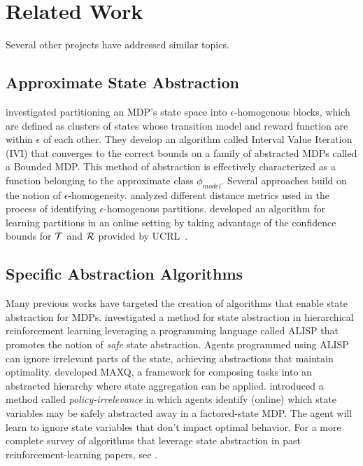 \section{Related Work}

Several other projects have addressed similar topics.

\subsection{Approximate State Abstraction}
\citep*{dean1997model} investigated partitioning an \ac{MDP}'s state space into $\epsilon$-homogenous blocks, which are defined as clusters of states whose transition model and reward function are within $\epsilon$ of each other. They develop an algorithm called Interval Value Iteration (IVI) that converges to the correct bounds on a family of abstracted MDPs called a Bounded MDP. This method of abstraction is effectively characterized as a function belonging to the approximate class $\phi_{model}$.
Several approaches build on the notion of $\epsilon$-homogeneity. \citep*{even2003approximate} analyzed different distance metrics used in the process of identifying $\epsilon$-homogenous partitions. \citep*{ortner2013adaptive} developed an algorithm for learning partitions in an online setting by taking advantage of the confidence bounds for $\mathcal{T}$ and $\mathcal{R}$ provided by UCRL~\cite{auer2009near}.

\subsection{Specific Abstraction Algorithms}
Many previous works have targeted the creation of algorithms that enable state abstraction for MDPs. \citep*{andre2002state} investigated a method for state abstraction in hierarchical reinforcement learning leveraging a programming language called ALISP that promotes the notion of {\it safe} state abstraction. Agents programmed using ALISP can ignore irrelevant parts of the state, achieving abstractions that maintain optimality. \citep{dietterich2000hierarchical} developed MAXQ, a framework for composing tasks into an abstracted hierarchy where state aggregation can be applied. \citep*{jong2005state} introduced a method called {\it policy-irrelevance} in which agents identify (online) which state variables may be safely abstracted away in a factored-state \ac{MDP}. The agent will learn to ignore state variables that don't impact optimal behavior. For a more complete survey of algorithms that leverage state abstraction in past reinforcement-learning papers, see \citep{li2006towards}.

